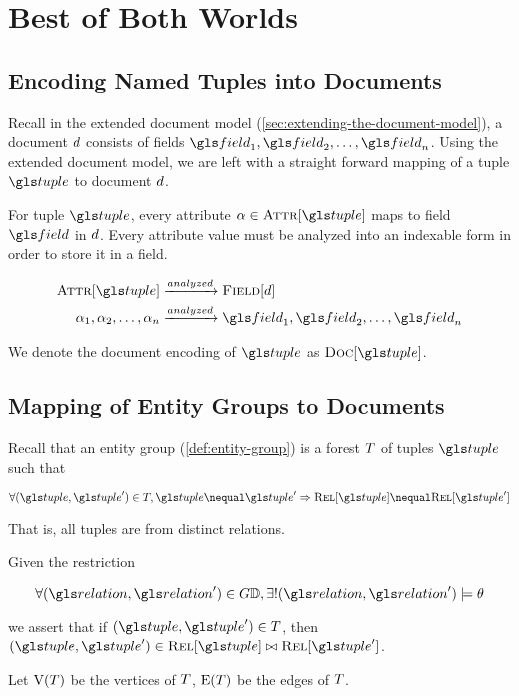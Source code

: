 \chapter{Best of Both Worlds}
	\section{Encoding Named Tuples into Documents}
	\label{sec:named-tuples-documents}
		Recall in the extended document model (\vref{sec:extending-the-document-model}), a document \(d\) consists of fields \(\field_1, \field_2, \dotsc, \field_n\).  Using the extended document model, we are left with a straight forward mapping of a tuple \(\tuple\) to document \(d\).
		
		For tuple \(\tuple\), every attribute \(\attribute \in \attributes{\tuple}\) maps to field \(\field\) in \(d\).	Every attribute value must be analyzed into an indexable form in order to store it in a field.
		
		\begin{align}
			\attributes{\tuple} &\xrightarrow{analyzed} \fields{\doc} \\
			\attribute_1, \attribute_2, \dotsc, \attribute_n &\xrightarrow{analyzed} \field_1, \field_2, \dotsc, \field_n
		\end{align}
		
		We denote the document encoding of \(\tuple\) as \(\docs{\tuple}\).
	
	\section{Mapping of Entity Groups to Documents}
		Recall that an entity group (\vref{def:entity-group}) is a forest \(T\) of tuples \(\tuple\) such that
		
		\[
			\forall (\tuple, \tuple') \in \egraph, \tuple \nequal \tuple' \Rightarrow \relations{\tuple} \nequal \relations{\tuple'}
		\]
		
		That is, all tuples are from distinct relations.
		
		Given the restriction
		
		\[
			\forall (\relation, \relation') \in \sgraph{\db}, \exists! (\relation, \relation') \models \theta
		\]
		
		we assert that if \((\tuple, \tuple') \in \egraph\), then \((\tuple, \tuple') \in \relations{\tuple} \bowtie \relations{\tuple'}\).
		
		Let \(\text{V}(T)\) be the vertices of \(T\), \(\text{E}(T)\) be the edges of \(T\).
		
